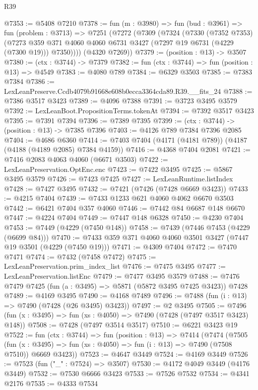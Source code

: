 \begin{lexlean}{R39}
\begin{coremodule}
@7353 := @5408 @7210
@7378 := fun (m : @3980) =>
  fun (bud : @3961) =>
  fun (problem : @3713) =>
  @7251
    (@7272
      (@7309
        (@7324
          (@7330
            (@7352 @7353)
            (@7273 @359 @371 @4060 @4060 @6731 @3427 (@7297 @19 @6731 (@4229 (@7300 @19))) @7350))))
      (@4320 @7269))
@7379 := (position : @13) -> @3507
@7380 := (ctx : @3744) -> @7379
@7382 := fun (ctx : @3744) => fun (position : @13) => @4549
@7383 := @4080 @789
@7384 := @6329 @3503
@7385 := @7383 @7384
@7386 := LexLeanPreserve.Ccdb4079b91668e608b0ecca3364cda89.R39.__fits_24
@7388 := @7386 @3517 @3423
@7389 := @4096 @7388
@7391 := @3723 @3495 @3579
@7392 := LexLeanBoot.PropositionTerms.tokenAt
@7394 := @7392 @3517 @3423
@7395 := @7391 @7394
@7396 := @7389 @7395
@7399 := (ctx : @3744) -> (position : @13) -> @7385 @7396
@7403 := @4126 @789 @7384 @7396 @2085
@7404 := @4686 @6360
@7414 := @7403 @7404 (@4171 (@4181 @789)) (@4187 (@4188 (@4189 @2085) @7384 @4159))
@7416 := @4368 @7404 @2081
@7421 := @7416 @2083 @4063 @4060 (@6671 @3503)
@7422 := LexLeanPreservation.OptEnc.enc
@7423 := @7422 @3495
@7425 := @5867 @3495 @3579
@7426 := @7423 @7425
@7427 := LexLeanRuntime.listIndex
@7428 := @7427 @3495
@7432 := @7421 (@7426 (@7428 @6669 @3423))
@7433 := @4215 @7404
@7439 := @7433 @1233 @621 @4060 @4062 @6670 @3503
@7442 := @6421 @7404 @357 @4060
@7446 := @7442 @84 @6687 @148 @6670
@7447 := @4224 @7404
@7449 := @7447 @148 @6328
@7450 := @4230 @7404
@7453 := @7449 (@4229 (@7450 @148))
@7458 := @7439 (@7446 @7453 (@4229 (@6699 @84)))
@7470 := @7433 @359 @371 @4060 @4060 @3501 @3427 (@7447 @19 @3501 (@4229 (@7450 @19)))
@7471 := @4309 @7404
@7472 := @7470 @7471
@7474 := @7432 (@7458 @7472)
@7475 := LexLeanPreservation.prim_index_list
@7476 := @7475 @3495
@7477 := LexLeanPreservation.listEnc
@7479 := @7477 @3495 @3579
@7488 := @7476 @7479 @7425 (fun (a : @3495) => @5871 (@5872 @3495 @7425 @3423)) @7428
@7489 := @4169 @3495
@7490 := @4168 @7489
@7496 := @7488 (fun (i : @13) => @7490 (@7428 (@26 @3495) @3423))
@7497 := @2 @3495
@7505 := @7496 (fun (x : @3495) => fun (xs : @4050) => @7490 (@7428 (@7497 @3517 @3423) @148))
@7508 := @7428 (@7497 @3514 @3517)
@7510 := @6221 @3423 @19
@7522 := fun (ctx : @3744) =>
  fun (position : @13) =>
  @7414
    (@7474
      (@7505
        (fun (x : @3495) => fun (xs : @4050) => fun (i : @13) => @7490 (@7508 @7510))
        @6669
        @3423))
@7523 := @4647 @3449
@7524 := @4169 @3449
@7526 := @7523 (fun ("_" : @7524) => @3507)
@7530 := @4172 @4049 @3449 (@4176 @3449)
@7532 := @7530 @6666 @3423
@7533 := @7526 @7532
@7534 := @4341 @2176
@7535 := @4333 @7534

\end{coremodule}
\end{lexlean}
